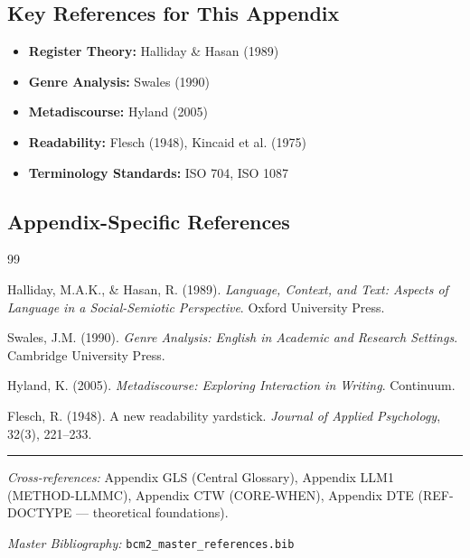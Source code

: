 \subsection{Key References for This Appendix}

\begin{itemize}[nosep]
    \item \textbf{Register Theory:} Halliday \& Hasan (1989)
    \item \textbf{Genre Analysis:} Swales (1990)
    \item \textbf{Metadiscourse:} Hyland (2005)
    \item \textbf{Readability:} Flesch (1948), Kincaid et al. (1975)
    \item \textbf{Terminology Standards:} ISO 704, ISO 1087
\end{itemize}

\subsection{Appendix-Specific References}

\begin{thebibliography}{99}

 Halliday, M.A.K., \& Hasan, R. (1989).
\textit{Language, Context, and Text: Aspects of Language in a Social-Semiotic Perspective}.
Oxford University Press.

 Swales, J.M. (1990).
\textit{Genre Analysis: English in Academic and Research Settings}.
Cambridge University Press.

 Hyland, K. (2005).
\textit{Metadiscourse: Exploring Interaction in Writing}.
Continuum.

 Flesch, R. (1948).
A new readability yardstick.
\textit{Journal of Applied Psychology}, 32(3), 221--233.

\end{thebibliography}



\vspace{1em}
\hrule
\vspace{0.5em}

\noindent\textit{Cross-references:}
Appendix GLS (Central Glossary),
Appendix LLM1 (METHOD-LLMMC),
Appendix CTW (CORE-WHEN),
Appendix DTE (REF-DOCTYPE --- theoretical foundations).

\noindent\textit{Master Bibliography:} \texttt{bcm2\_master\_references.bib}


